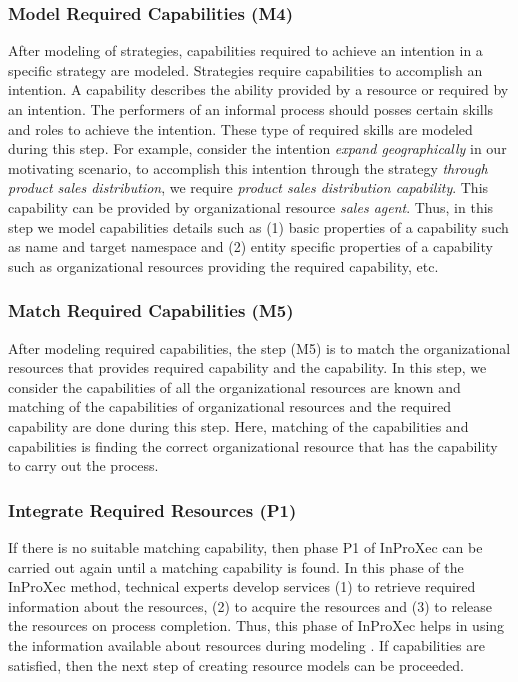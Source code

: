 \subsubsection{Model Required Capabilities (M4)}  
After modeling of strategies, capabilities required to achieve an intention in a specific strategy are modeled. Strategies require capabilities to accomplish an intention. A capability describes the ability provided by a resource or required by an intention. The performers of an informal process should posses certain skills and roles to achieve the intention. These type of required skills are modeled during this step. For example, consider the intention \textit{expand geographically} in our motivating scenario, to accomplish this intention through the strategy \textit{through product sales distribution}, we require \textit{product sales distribution capability}. This capability can be provided by organizational resource \textit{sales agent}. Thus, in this step we model capabilities details such as (1) basic properties of a capability such as name and target namespace and (2) entity specific properties of a capability such as organizational resources providing the required capability, etc.

\subsubsection{Match Required Capabilities (M5)} 
After modeling required capabilities, the step (M5) is to match the organizational resources that provides required capability and the capability. In this step, we consider the capabilities of all the organizational resources are known and matching of the capabilities of organizational resources and the required capability are done during this step. Here, matching of the capabilities and capabilities is finding the correct organizational resource that has the capability to carry out the process. 

\subsubsection{Integrate Required Resources (P1)} 
If there is no suitable matching capability, then phase P1 of InProXec can be carried out again until a matching capability is found. In this phase of the InProXec method, technical experts develop services (1) to retrieve required information about the resources, (2) to acquire the resources and (3) to release the resources on process completion. Thus, this phase of InProXec helps in using the information available about resources during modeling \cite{Sungur2015}. If capabilities are satisfied, then the next step of creating resource models can be proceeded.


